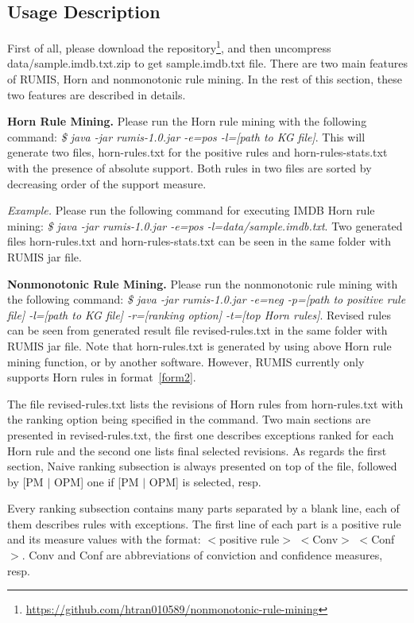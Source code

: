 \subsection{Usage Description}

First of all, please download the repository\footnote{\url{https://github.com/htran010589/nonmonotonic-rule-mining}}, and then uncompress data/sample.imdb.txt.zip to get sample.imdb.txt file. There are two main features of RUMIS, Horn and nonmonotonic rule mining. In the rest of this section, these two features are described in details.

\textbf{Horn Rule Mining.} Please run the Horn rule mining with the following command: \textit{\$ java -jar rumis-1.0.jar -e=pos -l=[path to KG file]}. This will generate two files, horn-rules.txt for the positive rules and horn-rules-stats.txt with the presence of absolute support. Both rules in two files are sorted by decreasing order of the support measure.

\textit{Example.} Please run the following command for executing IMDB Horn rule mining: \textit{\$ java -jar rumis-1.0.jar -e=pos -l=data/sample.imdb.txt}. Two generated files horn-rules.txt and horn-rules-stats.txt can be seen in the same folder with RUMIS jar file.

\textbf{Nonmonotonic Rule Mining.} Please run the nonmonotonic rule mining with the following command: \textit{\$ java -jar rumis-1.0.jar -e=neg -p=[path to positive rule file] -l=[path to KG file] -r=[ranking option] -t=[top Horn rules]}. Revised rules can be seen from generated result file revised-rules.txt in the same folder with RUMIS jar file. Note that horn-rules.txt is generated by using above Horn rule mining function, or by another software. However, RUMIS currently only supports Horn rules in format~\ref{form2}.

The file revised-rules.txt lists the revisions of Horn rules from horn-rules.txt with the ranking option being specified in the command. Two main sections are presented in revised-rules.txt, the first one describes exceptions ranked for each Horn rule and the second one lists final selected revisions. As regards the first section, Naive ranking subsection is always presented on top of the file, followed by [PM $|$ OPM] one if [PM $|$ OPM] is selected, resp.

Every ranking subsection contains many parts separated by a blank line, each of them describes rules with exceptions. The first line of each part is a positive rule and its measure values with the format: $<$positive rule$>$ $<$Conv$>$ $<$Conf$>$. Conv and Conf are abbreviations of conviction and confidence measures, resp.


